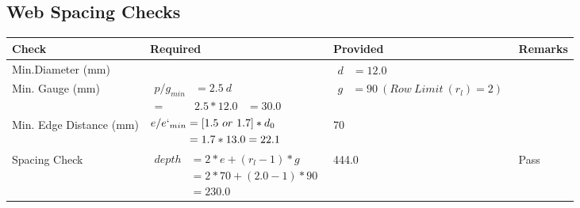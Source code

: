 \documentclass{article}%
\begin{document}
\subsection{Web Spacing Checks}%
\label{subsec:WebSpacingChecks}%
\renewcommand{\arraystretch}{1.2}%
\begin{longtable}{|p{2.5cm}|p{7.5cm}|p{5cm}|p{1cm}|}%
\hline%
\rowcolor{OsdagGreen}%
Check&Required&Provided&Remarks\\%
\hline%
\endhead%
\hline%
Min.Diameter (mm)&&$\begin{aligned} d &=12.0\end{aligned}$&\\%
\hline%
Min. Gauge (mm)&$\begin{aligned}p/g_{min}&= 2.5 ~ d&\\ =&2.5*12.0&=30.0\end{aligned}$&$\begin{aligned} g &=90~(Row~Limit~(r_l) = 2)\end{aligned}$&\\%
\hline%
Min. Edge Distance (mm)&$\begin{aligned}e/e`_{min} &=[1.5~or~ 1.7] * d_0\\ &=1.7*13.0=22.1 \end{aligned}$&70&\\%
\hline%
Spacing Check&$\begin{aligned} depth & = 2 * e + (r_l -1) * g\\ & = 2 * 70+(2.0-1)*90\\ & = 230.0\end{aligned}$&444.0&Pass\\%
\hline%
\end{longtable}

%
\newpage%
\end{document}
